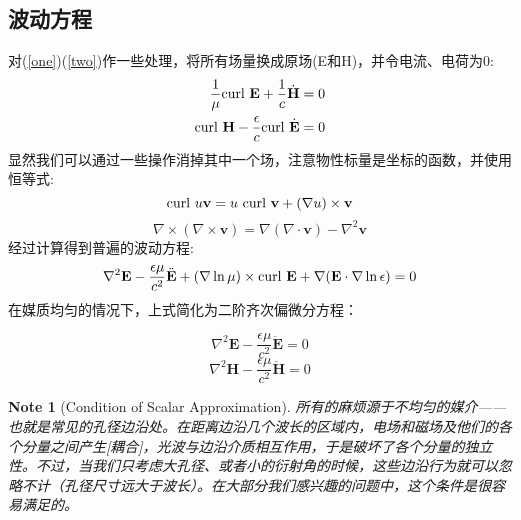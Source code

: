 \documentclass[12pt]{ctexart}%
\newtheorem{note}{Note}
\begin{document}
\subsection*{波动方程}
对(\ref{one})(\ref{two})作一些处理，将所有场量换成原场(E和H)，并令电流、电荷为0:
\begin{equation}
    \begin{aligned}
        \frac{1}{\mu}\textup{curl }\textbf{E} + \frac{1}{c}\dot{\textbf{H}} &=0\\
        \textup{curl }\textbf{H} - \frac{\epsilon}{c}\textup{curl }\dot{\textbf{E}} &=0
    \end{aligned}
\end{equation}
显然我们可以通过一些操作消掉其中一个场，注意物性标量是坐标的函数，并使用恒等式:
\begin{equation}
    \textup{curl }u\textbf{v} = u\textup{ curl }\textbf{v}+(\nabla u)\times\textbf{v}
\end{equation}
\begin{equation}
    \nabla\times(\nabla\times\textbf{v})=\nabla(\nabla\cdot\textbf{v})-\nabla^2\textbf{v}
\end{equation}
经过计算得到普遍的波动方程:
\begin{equation}
    \nabla^2\textbf{E}-\frac{\epsilon\mu}{c^2}\ddot{\textbf{E}}+(\nabla \ln \mu)\times\textup{curl }\textbf{E}+\nabla(\textbf{E}\cdot\nabla \ln \epsilon) = 0
\end{equation}
在媒质均匀的情况下，上式简化为二阶齐次偏微分方程：
\begin{framed}
    \begin{equation}
        \nabla^2\textbf{E}-\frac{\epsilon\mu}{c^2}\ddot{\textbf{E}} = 0
        \label{waveequ}
    \end{equation}
    \begin{equation}
        \nabla^2\textbf{H}-\frac{\epsilon\mu}{c^2}\ddot{\textbf{H}} = 0
    \end{equation}
\end{framed}
\begin{note}[Condition of Scalar Approximation]
    所有的麻烦源于不均匀的媒介——也就是常见的孔径边沿处。在距离边沿几个波长的区域内，电场和磁场及他们的各个分量之间产生[耦合]，光波与边沿介质相互作用，于是破坏了各个分量的独立性。不过，当我们只考虑大孔径、或者小的衍射角的时候，这些边沿行为就可以忽略不计（孔径尺寸远大于波长）。在大部分我们感兴趣的问题中，这个条件是很容易满足的。
\end{note}
\end{document}
